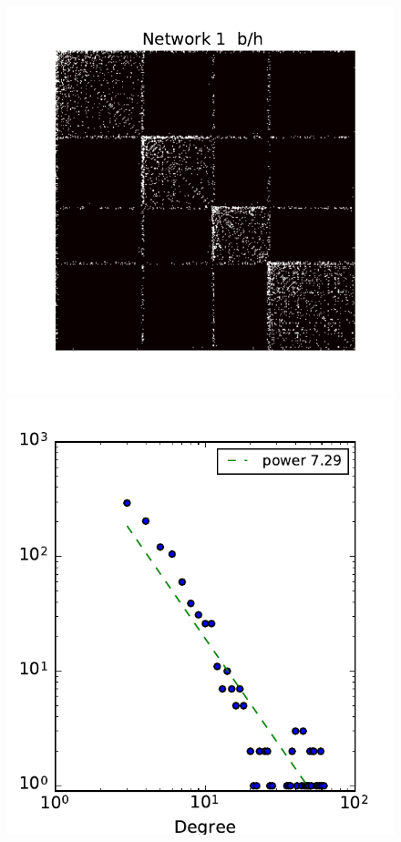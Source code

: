 \begin{figure}[h]
	\centering
	
	\includegraphics[scale=0.4]{img/g1}
	\endminipage
	\includegraphics[scale=0.4]{img/g1_d}

\end{figure}
